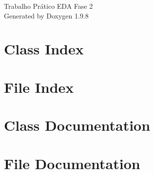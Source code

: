 \documentclass[twoside]{book}
\newcommand{\+}{\discretionary{\mbox{\scriptsize$\hookleftarrow$}}{}{}}
\newcommand{\clearemptydoublepage}{%
    \newpage{\pagestyle{empty}\cleardoublepage}%
  }
\begin{document}
  \raggedbottom
    \hypersetup{pageanchor=false,
                bookmarksnumbered=true,
                pdfencoding=unicode
               }
  \begin{titlepage}
  \vspace*{7cm}
  \begin{center}%
  {\Large Trabalho Prático EDA Fase 2}\\
  \vspace*{1cm}
  {\large Generated by Doxygen 1.9.8}\\
  \end{center}
  \end{titlepage}
  \clearemptydoublepage
  \tableofcontents
  \clearemptydoublepage
  \hypersetup{pageanchor=true}
\chapter{Class Index}

\chapter{File Index}

\chapter{Class Documentation}




\chapter{File Documentation}




  \backmatter
  \newpage
  \clearemptydoublepage
  \printindex
\end{document}

